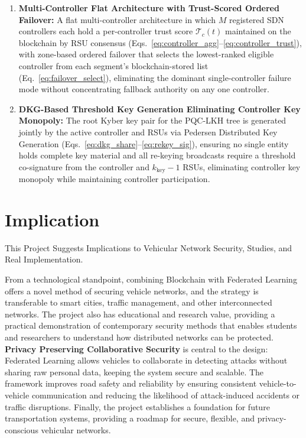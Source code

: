 \documentclass[12pt, a4paper]{report}
\newcommand{\mypar}{\vspace{0.8em}\noindent}
\begin{document}
\begin{enumerate}
  \item \textbf{Multi-Controller Flat Architecture with Trust-Scored Ordered
  Failover:}
  A flat multi-controller architecture in which $M$ registered SDN controllers
  each hold a per-controller trust score $\mathcal{T}_c(t)$ maintained on the
  blockchain by RSU consensus
  (Eqs.~\eqref{eq:controller_agg}--\eqref{eq:controller_trust}), with
  zone-based ordered failover that selects the lowest-ranked eligible controller
  from each segment's blockchain-stored list (Eq.~\eqref{eq:failover_select}),
  eliminating the dominant single-controller failure mode without concentrating
  fallback authority on any one controller.

  \item \textbf{DKG-Based Threshold Key Generation Eliminating Controller Key
  Monopoly:}
  The root Kyber key pair for the PQC-LKH tree is generated jointly by the
  active controller and RSUs via Pedersen Distributed Key Generation
  (Eqs.~\eqref{eq:dkg_share}--\eqref{eq:rekey_sig}), ensuring no single entity
  holds complete key material and all re-keying broadcasts require a threshold
  co-signature from the controller and $k_{\text{key}}-1$ RSUs, eliminating
  controller key monopoly while maintaining controller participation.
\end{enumerate}


\mypar
\section{Implication}

This Project Suggests Implications to Vehicular Network Security, Studies, and Real Implementation.

From a technological standpoint, combining Blockchain with Federated Learning offers a novel method of securing vehicle networks, and the strategy is transferable to smart cities, traffic management, and other interconnected networks.
The project also has educational and research value, providing a practical demonstration of contemporary security methods that enables students and researchers to understand how distributed networks can be protected.
\textbf{Privacy Preserving Collaborative Security} is central to the design: Federated Learning allows vehicles to collaborate in detecting attacks without sharing raw personal data, keeping the system secure and scalable.
The framework improves road safety and reliability by ensuring consistent vehicle-to-vehicle communication and reducing the likelihood of attack-induced accidents or traffic disruptions.
Finally, the project establishes a foundation for future transportation systems, providing a roadmap for secure, flexible, and privacy-conscious vehicular networks.
\end{document}
